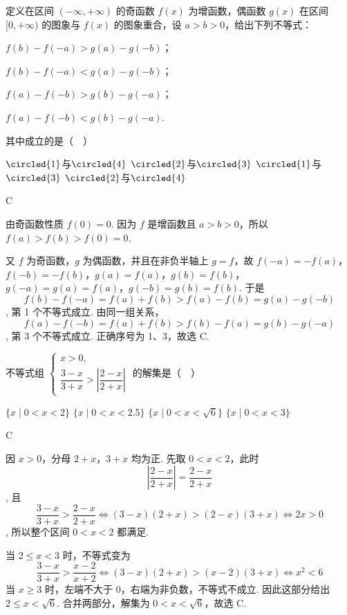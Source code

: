 \begin{problem}
定义在区间 \((-\infty, +\infty)\) 的奇函数 \(f(x)\) 为增函数，偶函数 \(g(x)\) 在区间 \([0, +\infty)\) 的图象与 \(f(x)\) 的图象重合，设 \(a > b > 0\)，给出下列不等式：
\begin{circlelist}
\item \(f(b) - f(-a) > g(a) - g(-b)\)；
\item \(f(b) - f(-a) < g(a) - g(-b)\)；
\item \(f(a) - f(-b) > g(b) - g(-a)\)；
\item \(f(a) - f(-b) < g(b) - g(-a)\).
\end{circlelist}
其中成立的是（\(\quad\)）

\choices
    {\(\circled{1}\)与\(\circled{4}\)}
    {\(\circled{2}\)与\(\circled{3}\)}
    {\(\circled{1}\)与\(\circled{3}\)}
    {\(\circled{2}\)与\(\circled{4}\)}

\end{problem}

\begin{answer}
C
\end{answer}

\begin{solution}
由奇函数性质 \(f(0)=0\). 因为 \(f\) 是增函数且 \(a>b>0\)，所以 \(f(a)>f(b)>f(0)=0\).

又 \(f\) 为奇函数，\(g\) 为偶函数，并且在非负半轴上 \(g=f\)，故 \(f(-a)=-f(a)\)，\(f(-b)=-f(b)\)，\(g(a)=f(a)\)，\(g(b)=f(b)\)，\(g(-a)=g(a)=f(a)\)，\(g(-b)=g(b)=f(b)\).
于是
\[
f(b)-f(-a)=f(a)+f(b)>f(a)-f(b)=g(a)-g(-b)
\],
第 1 个不等式成立. 由同一组关系，
\[
f(a)-f(-b)=f(a)+f(b)>f(b)-f(a)=g(b)-g(-a)
\],
第 3 个不等式成立. 正确序号为 1、3，故选 C.
\end{solution}

\begin{problem}
不等式组 \(\begin{cases}
x > 0,\\
\dfrac{3-x}{3+x} > \left|\dfrac{2-x}{2+x}\right|
\end{cases}\) 的解集是（\(\quad\)）

\choices
    {\(\{x \mid 0 < x < 2\} \)}
    {\(\{x\mid 0 < x < 2.5\}\)}
    {\(\{x \mid 0 < x < \sqrt{6}\} \)}
    {\(\{x\mid 0 < x < 3\}\)}

\end{problem}

\begin{answer}
C
\end{answer}

\begin{solution}
因 \(x>0\)，分母 \(2+x\)，\(3+x\) 均为正. 先取 \(0<x<2\)，此时
\[
\left|\frac{2-x}{2+x}\right|=\frac{2-x}{2+x}
\],
且
\[
\frac{3-x}{3+x}>\frac{2-x}{2+x}
\iff (3-x)(2+x)>(2-x)(3+x)
\iff 2x>0
\],
所以整个区间 \(0<x<2\) 都满足.

当 \(2\leqslant x<3\) 时，不等式变为
\[
\frac{3-x}{3+x}>\frac{x-2}{x+2}
\iff (3-x)(2+x)>(x-2)(3+x)
\iff x^2<6
\]
当 \(x\geqslant3\) 时，左端不大于 \(0\)，右端为非负数，不等式不成立. 因此这部分给出 \(2\leqslant x<\sqrt6\). 合并两部分，解集为 \(0<x<\sqrt6\)，故选 C.
\end{solution}

